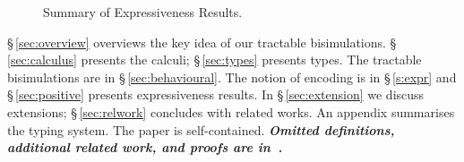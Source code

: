 \begin{figure}[t]
	\begin{center}
	\end{center}
\caption{Summary of Expressiveness Results. \label{fig:express}}
\Hline
\end{figure}

\smallskip

\S\,\ref{sec:overview} overviews the key idea of our tractable bisimulations.
\noi \S\,\ref{sec:calculus} presents the calculi; 
\S\,\ref{sec:types} presents types.
The tractable bisimulations are in \S\,\ref{sec:behavioural}.
The notion of encoding is in \S\,\ref{s:expr} and
\S\,\ref{sec:positive} %
presents expressiveness results.
In \S\,\ref{sec:extension} we discuss extensions; 
\S\,\ref{sec:relwork} concludes with related works.
An appendix summarises the typing system. 
The paper is self-contained. 
{\bf\em Omitted definitions, additional related work, and  proofs 
are 
in~\cite{KouzapasPY15}.} 

